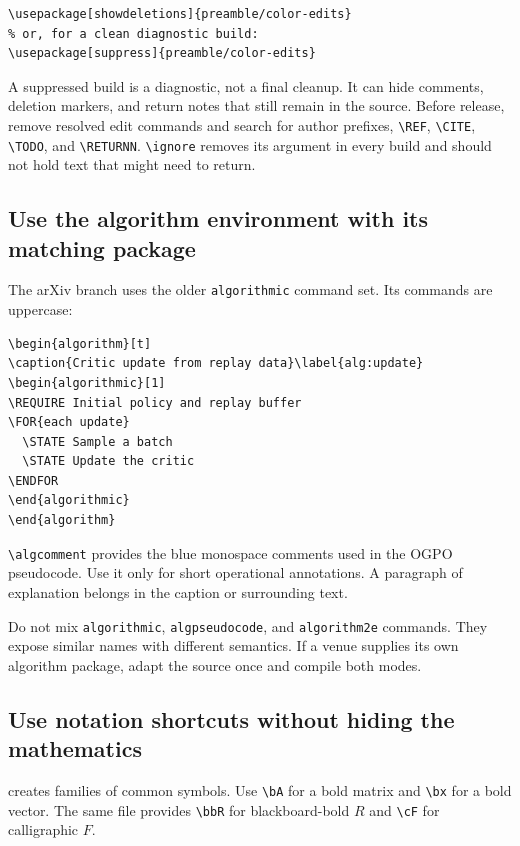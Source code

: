 \begin{verbatim}
\usepackage[showdeletions]{preamble/color-edits}
% or, for a clean diagnostic build:
\usepackage[suppress]{preamble/color-edits}
\end{verbatim}

A suppressed build is a diagnostic, not a final cleanup. It can hide comments,
deletion markers, and return notes that still remain in the source. Before
release, remove resolved edit commands and search for author prefixes,
\texttt{\textbackslash REF}, \texttt{\textbackslash CITE},
\texttt{\textbackslash TODO}, and \texttt{\textbackslash RETURNN}.
\texttt{\textbackslash ignore} removes its argument in every build and should
not hold text that might need to return.

\subsection{Use the algorithm environment with its matching package}

The arXiv branch uses the older \texttt{algorithmic} command set. Its commands
are uppercase:

\begin{verbatim}
\begin{algorithm}[t]
\caption{Critic update from replay data}\label{alg:update}
\begin{algorithmic}[1]
\REQUIRE Initial policy and replay buffer
\FOR{each update}
  \STATE Sample a batch
  \STATE Update the critic
\ENDFOR
\end{algorithmic}
\end{algorithm}
\end{verbatim}

\texttt{\textbackslash algcomment} provides the blue monospace comments used
in the OGPO pseudocode. Use it only for short operational annotations. A
paragraph of explanation belongs in the caption or surrounding text.

Do not mix \texttt{algorithmic}, \texttt{algpseudocode}, and
\texttt{algorithm2e} commands. They expose similar names with different
semantics. If a venue supplies its own algorithm package, adapt the source once
and compile both modes.

\subsection{Use notation shortcuts without hiding the mathematics}

 creates families of common symbols. Use
\texttt{\textbackslash bA} for a bold matrix and
\texttt{\textbackslash bx} for a bold vector. The same file provides
\texttt{\textbackslash bbR} for blackboard-bold \(R\) and
\texttt{\textbackslash cF} for calligraphic \(F\).

